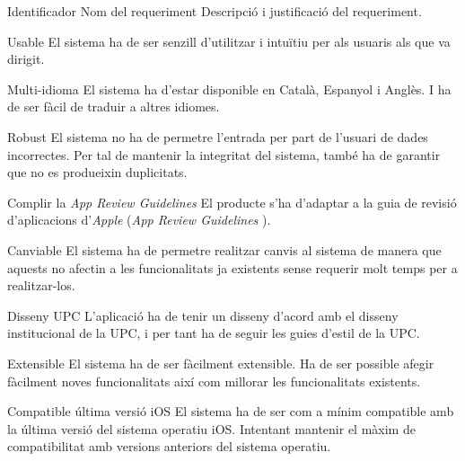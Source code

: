 \bgroup


\pintarRequisitBox
    {Identificador}
    {Nom del requeriment}
    {Descripció i justificació del requeriment.}

\pintarRequisit
    {Usable}
    {El sistema ha de ser senzill d'utilitzar i intuïtiu per als usuaris als que va dirigit.}
    
\pintarRequisit
    {Multi-idioma}
    {El sistema ha d'estar disponible en Català, Espanyol i Anglès. I ha de ser fàcil de traduir a altres idiomes.}

\pintarRequisit
    {Robust}
    {El sistema no ha de permetre l'entrada per part de l'usuari de dades incorrectes. Per tal de mantenir la integritat del sistema, també ha de garantir que no es produeixin duplicitats.}

\pintarRequisit
    {Complir la \textit{App Review Guidelines}}
    {El producte s'ha d'adaptar a la guia de revisió d'aplicacions d'\textit{Apple} (\textit{App Review Guidelines}  \cite{apple_app_review_guideliness}).}
    
\pintarRequisit
    {Canviable}
    {El sistema ha de permetre realitzar canvis al sistema de manera que aquests no afectin a les funcionalitats ja existents sense requerir molt temps per a realitzar-los.}

\pintarRequisit
    {Disseny UPC}
    {L'aplicació ha de tenir un disseny d'acord amb el disseny institucional de la UPC, i per tant ha de seguir les guies d'estil de la UPC\cite{guia_estil_upc}.}
    
\pintarRequisit
    {Extensible}
    {El sistema ha de ser fàcilment extensible. Ha de ser possible afegir fàcilment noves funcionalitats així com millorar les funcionalitats existents.}
    
\pintarRequisit
    {Compatible última versió iOS}
    {El sistema ha de ser com a mínim compatible amb la última versió del sistema operatiu iOS. Intentant mantenir el màxim de compatibilitat amb versions anteriors del sistema operatiu.}

\egroup

\clearpage